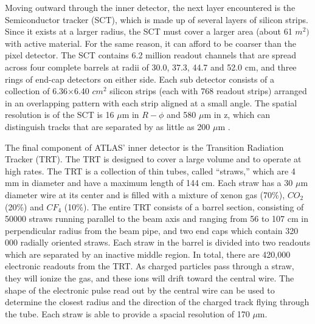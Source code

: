 
Moving outward through the inner detector, the next layer encountered is the Semiconductor tracker (SCT), which is made up of several layers of silicon strips.
Since it exists at a larger radius, the SCT must cover a larger area (about 61 $m^2)$ with active material.
For the same reason, it can afford to be coarser than the pixel detector.
The SCT contains 6.2 million readout channels that are spread across four complete barrels at radii of 30.0, 37.3, 44.7 and 52.0 cm, and three rings of end-cap detectors on either side.
Each sub detector consists of a collection of 6.36$\times$6.40 $cm^2$ silicon strips (each with 768 readout strips) arranged in an overlapping pattern with each strip aligned at a small angle.
The spatial resolution is of the SCT is 16 $\mu$m in $R-\phi$ and 580 $\mu$m in z, which can distinguish tracks that are separated by as little as 200 $\mu$m \cite{PIXEL_PERFORMANCE}.

The final component of ATLAS' inner detector is the Transition Radiation Tracker (TRT).
The TRT is designed to cover a large volume and to operate at high rates.
The TRT is a collection of thin tubes, called ``straws,'' which are 4 mm in diameter and have a maximum length of 144 cm.
Each straw has a 30 $\mu$m diameter wire at its center and is filled with a mixture of xenon gas (70\%), $CO_2$ (20\%) and $CF_{4}$ (10\%).
The entire TRT consists of a barrel section, consisting of 50000 straws running parallel to the beam axis and ranging from 56 to 107 cm in perpendicular radius from the beam pipe, and two end caps which contain 320 000 radially oriented straws.
Each straw in the barrel is divided into two readouts which are separated by an inactive middle region.
In total, there are 420,000 electronic readouts from the TRT.
As charged particles pass through a straw, they will ionize the gas, and these ions will drift toward the central wire.
The shape of the electronic pulse read out by the central wire can be used to determine the closest radius and the direction of the charged track flying through the tube.
Each straw is able to provide a spacial resolution of 170 $\mu$m.



